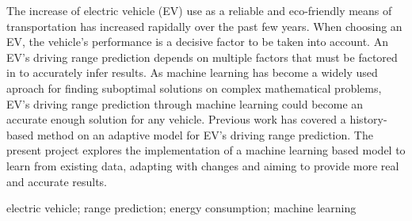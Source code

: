 \abstractEN %



The increase of electric vehicle (EV) use as a reliable and
eco-friendly means of transportation has increased rapidally over
the past few years.
When choosing an EV, the vehicle's performance is a decisive factor
to be taken into account.
An EV's driving range prediction depends on multiple factors that must
be factored in to accurately infer results.
As machine learning has become a widely used aproach for
finding suboptimal solutions on complex mathematical problems,
EV's driving range prediction through machine learning
could become an accurate enough solution for any vehicle.
Previous work has covered a history-based method on an adaptive model
for EV's driving range prediction.
The present project explores the implementation of a machine learning
based model to learn from existing data, adapting with changes
and aiming to provide more real and accurate results.

%
%
%
%
%
%
%
%

\begin{keywords}
    electric vehicle;
    range prediction;
    energy consumption;
    machine learning
\end{keywords} 
